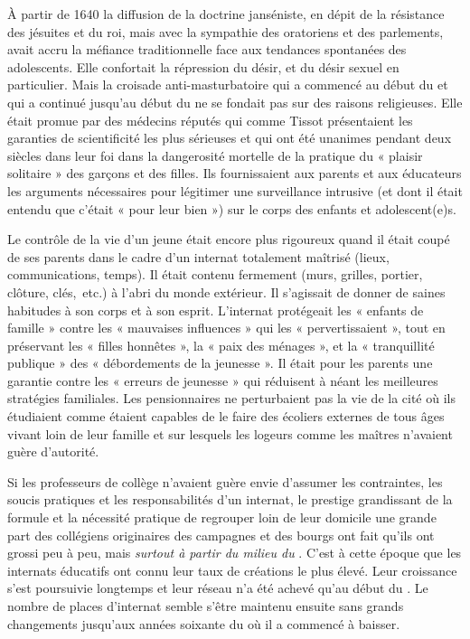   À partir de 1640 la diffusion de la doctrine janséniste, en dépit de la résistance des jésuites et du roi, mais avec la sympathie des oratoriens et des parlements, avait accru la méfiance traditionnelle face aux tendances spontanées des adolescents. Elle confortait la répression du désir, et du désir sexuel en particulier. Mais la croisade anti-masturbatoire qui a commencé au début du  et qui a continué jusqu'au début du  ne se fondait pas sur des raisons religieuses. Elle était promue par des médecins réputés qui comme Tissot présentaient les garanties de scientificité les plus sérieuses et qui ont été unanimes pendant deux siècles dans leur foi dans la dangerosité mortelle de la pratique du « plaisir solitaire » des garçons et des filles. Ils fournissaient aux parents et aux éducateurs les arguments nécessaires pour légitimer une surveillance intrusive (et dont il était entendu que c'était « pour leur bien ») sur le corps des enfants et adolescent(e)s.
  
  Le contrôle de la vie d'un jeune était encore plus rigoureux quand il était coupé de ses parents dans le cadre d'un internat totalement maîtrisé (lieux, communications, temps). Il était contenu fermement (murs, grilles, portier, clôture, clés,~etc.) à l'abri du monde extérieur. Il s'agissait de donner de saines habitudes à son corps et à son esprit.  L'internat protégeait les « enfants de famille » contre les « mauvaises influences » qui les « pervertissaient », tout en préservant les « filles honnêtes », la « paix des ménages », et la « tranquillité publique » des « débordements de la jeunesse ». Il était pour les parents une garantie contre les « erreurs de jeunesse » qui réduisent à néant les meilleures stratégies familiales. Les pensionnaires ne perturbaient pas la vie de la cité où ils étudiaient comme étaient capables de le faire des écoliers externes de tous âges vivant loin de leur famille et sur lesquels les logeurs comme les maîtres n'avaient guère d'autorité. 
  
  Si les professeurs de collège n'avaient guère envie d'assumer les contraintes, les soucis pratiques et les responsabilités d'un internat, le prestige grandissant de la formule et la nécessité pratique de regrouper loin de leur domicile une grande part des collégiens originaires des campagnes et des bourgs  ont fait qu'ils ont grossi peu à peu, mais \emph{surtout à partir du milieu du }. C'est à cette époque que les internats éducatifs ont connu leur taux de créations le plus élevé. Leur croissance s'est poursuivie longtemps et leur réseau n'a été achevé qu'au début du . Le nombre de places d'internat semble s'être maintenu ensuite sans grands changements jusqu'aux années soixante du  où il a commencé à baisser.
 
 
 
  




